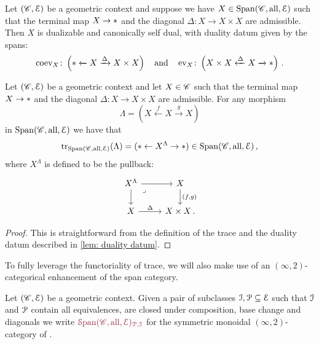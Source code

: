 \begin{lem}\label{lem: duality datum}
    Let $(\mathscr{C},\mathcal{E})$ be a geometric context and suppose we have $X\in \operatorname{\mathrm{Span}}({\mathscr{C}, \mathrm{all}, \mathcal{E}})$ 
    such that the terminal map $X\to \ast$ and the diagonal 
    $\Delta \colon X \to X\times X$ are admissible. 
    Then $X$ is dualizable and canonically self dual, with duality datum given by the 
    spans:
    \[  \operatorname{coev}_X\colon \left( \ast \xleftarrow{} X \xrightarrow{\Delta} X\times X\right)
      \quad \text{and}\quad  \operatorname{ev}_{X}\colon \left( X\times X \xleftarrow{\Delta} X \xrightarrow{} \ast
    \right)\,.\]
\end{lem}

\begin{lem}\label{lem: trace in Span}
   Let $(\mathscr{C},\mathcal{E})$ be a geometric context and let $X\in \mathscr{C}$ such that the terminal
   map $X\to \ast$ and the diagonal $\Delta \colon X \to X\times X$ are admissible.
   For any morphism
   \[\Lambda= (X\xleftarrow{f}X\xrightarrow{g}X)\] 
   in $\operatorname{\mathrm{Span}}({\mathscr{C}, \mathrm{all}, \mathcal{E}})$ we have that 
   \[\mathrm{tr}_{\operatorname{\mathrm{Span}}({\mathscr{C}, \mathrm{all}, \mathcal{E}})} (\Lambda) = (\ast \leftarrow X^{\Lambda} \to \ast ) \in \operatorname{\mathrm{Span}}({\mathscr{C}, \mathrm{all}, \mathcal{E}})\,,\]
   where $X^{\Lambda}$ is defined to be the pullback: 
   \[\begin{tikzcd}
	{X^{\Lambda}} & X \\
	X & {X\times X\,.}
	\arrow[from=1-1, to=1-2]
	\arrow[from=1-1, to=2-1]
	\arrow["\lrcorner"{anchor=center, pos=0.125}, draw=none, from=1-1, to=2-2]
	\arrow["{(f,g)}", from=1-2, to=2-2]
	\arrow["\Delta", from=2-1, to=2-2]
\end{tikzcd}\]
\end{lem}
\begin{proof}
 This is straightforward from the definition of the trace and the duality datum described  
 in \cref{lem: duality datum}. 
\end{proof}
To fully leverage the functoriality of trace, we will also
make use of an $(\infty,2)$-categorical enhancement of the span
category.

\begin{defn}\label{defn: Span 2-cat}
Let $(\mathscr{C},\mathcal{E})$ be a geometric context. Given a pair of subclasses
$\mathcal{I}, \mathcal{P} \subseteq \mathcal{E}$ 
such that $\mathcal{I}$ and $\mathcal{P}$ contain all equivalences, are closed
under composition, base change and diagonals we write
$\mdef{\sSpan{\cC, \all, \cE}_{\cP,\cI}}$ for the symmetric monoidal 
$(\infty,2)$-category of \cite[Definition 4.10]{Cnossen_Lenz_Linskens2026}. 
\end{defn}

